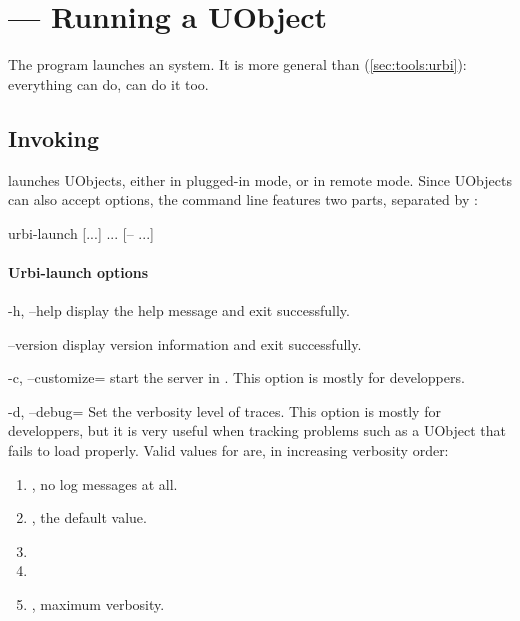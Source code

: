 \section{ --- Running a UObject}
\label{sec:tools:urbi-launch}

The  program launches an \urbi system.  It is
more general than  (\autoref{sec:tools:urbi}):
everything  can do,  can do it too.

\subsection{Invoking }

 launches UObjects, either in plugged-in mode, or
in remote mode.  Since UObjects can also accept options, the command
line features two parts, separated by \samp{--}:

\begin{shell}
urbi-launch [...] ... [-- ...]
\end{shell}

\paragraph{Urbi-launch options}
\begin{options}
\item[-h, --help] display the help message and exit successfully.
\item[--version] display version information and exit successfully.
\item[-c, --customize=\var{file}] start the \urbi server in
  .  This option is mostly for developpers.
\item[-d, --debug=\var{level}] Set the verbosity level of traces.
  This option is mostly for developpers, but it is very useful when
  tracking problems such as a UObject that fails to load properly.
  Valid values for  are, in increasing verbosity order:
  \begin{enumerate}
  \item {}, no log messages at all.
  \item {}, the default value.
  \item {}
  \item {}
  \item {}, maximum verbosity.
  \end{enumerate}
\end{options}

